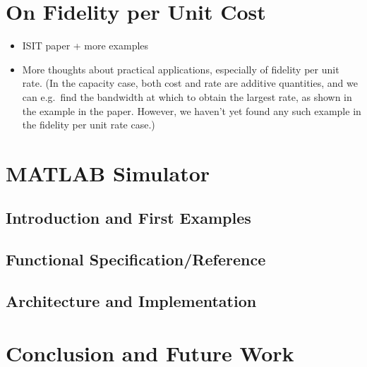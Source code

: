 \documentclass[a4paper]{article}
\theoremstyle{definition}
\begin{document}
\section{On Fidelity per Unit Cost}
\begin{itemize}
  \item ISIT paper + more examples
  \item More thoughts about practical applications, especially of fidelity per
    unit rate. (In the capacity case, both cost and rate are additive
    quantities, and we can e.g.\ find the bandwidth at which to obtain the
    largest rate, as shown in the example in the paper. However, we haven't yet
    found any such example in the fidelity per unit rate case.)
\end{itemize}


\section{MATLAB Simulator}
\subsection{Introduction and First Examples}
\subsection{Functional Specification/Reference}
\subsection{Architecture and Implementation}

\section{Conclusion and Future Work}

%
\end{document}
